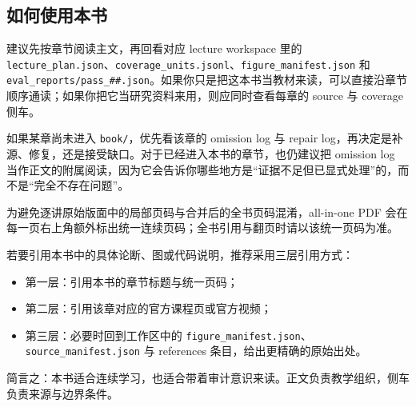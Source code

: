 \subsection*{如何使用本书}
建议先按章节阅读主文，再回看对应 lecture workspace 里的 \texttt{lecture\_plan.json}、\texttt{coverage\_units.jsonl}、\texttt{figure\_manifest.json} 和 \texttt{eval\_reports/pass\_\#\#.json}。如果你只是把这本书当教材来读，可以直接沿章节顺序通读；如果你把它当研究资料来用，则应同时查看每章的 source 与 coverage 侧车。

如果某章尚未进入 \texttt{book/}，优先看该章的 omission log 与 repair log，再决定是补源、修复，还是接受缺口。对于已经进入本书的章节，也仍建议把 omission log 当作正文的附属阅读，因为它会告诉你哪些地方是“证据不足但已显式处理”的，而不是“完全不存在问题”。

为避免逐讲原始版面中的局部页码与合并后的全书页码混淆，all-in-one PDF 会在每一页右上角额外标出统一连续页码；全书引用与翻页时请以该统一页码为准。

若要引用本书中的具体论断、图或代码说明，推荐采用三层引用方式：
\begin{itemize}
    \item 第一层：引用本书的章节标题与统一页码；
    \item 第二层：引用该章对应的官方课程页或官方视频；
    \item 第三层：必要时回到工作区中的 \texttt{figure\_manifest.json}、\texttt{source\_manifest.json} 与 references 条目，给出更精确的原始出处。
\end{itemize}

简言之：本书适合连续学习，也适合带着审计意识来读。正文负责教学组织，侧车负责来源与边界条件。
